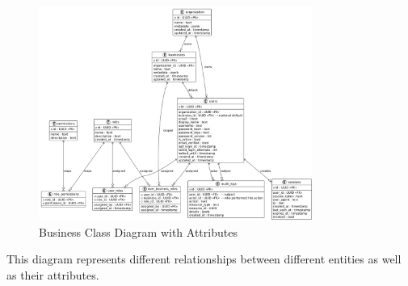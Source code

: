\documentclass[]{VUMIFTemplateClass}
\begin{document}
\begin{figure}[H]
    \centering
    \includegraphics[width=0.8\textwidth]{images/diagrams/business/data_model_business.png}
    \caption{Business Class Diagram with Attributes}
    \label{fig:business_class_diagram}
\end{figure}
This diagram represents different relationships between different entities as well as their attributes. 

\printbibliography[title = {References and sources}]
\end{document}
